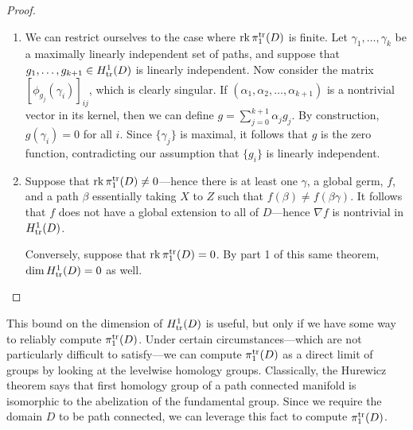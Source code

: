 \begin{proof}
  \phantom{hello!}
\begin{enumerate}
    \item We can restrict ourselves to the case where \(\operatorname{rk} \pi_1^{\operatorname{tr}}(D)\) is
        finite. Let \(\gamma_1, \dots ,\gamma_k\) be a maximally linearly
        independent set of paths, and suppose that
        \(g_1, \dots , g_{k+1} \in H^1_{\operatorname{tr}}(D)\) is linearly independent. Now
        consider the matrix \([\phi_{g_j}(\gamma_i)]_{ij}\), which is clearly
        singular. If \((\alpha_1, \alpha_2, \dots, \alpha_{k+1})\) is a
        nontrivial vector in its
        kernel, then we can define \(g = \sum_{j=0}^{k+1} \alpha_j g_j\). By
        construction, \(g(\gamma_i)=0\) for all \(i\). Since \(\{\gamma_j\} \)
        is maximal, it follows that \(g\) is the zero function, contradicting
        our assumption that \(\{g_i\} \) is linearly independent.

    \item Suppose that \(\operatorname{rk} \pi_1^{\operatorname{tr}}(D) \neq 0\)---hence there is at least
        one \(\gamma\), a global germ, \(f\), and a path \(\beta\) essentially
        taking \(X\) to \(Z\) such that \(f(\beta) \neq f(\beta\gamma)\). It
        follows that \(f\) does not have a global extension to all of
        \(D\)---hence \(\nabla f\) is nontrivial in \(H^1_{\operatorname{tr}}(D)\).

        Conversely, suppose that \(\operatorname{rk} \pi_1^{\operatorname{tr}}(D)=0\). By part 1 of this
        same theorem,
        \(\dim H^1_{\operatorname{tr}}(D)=0\) as well.
\end{enumerate}
\end{proof}

This bound on the dimension of \(H^1_{\operatorname{tr}}(D)\) is useful, but only if we have some
way to reliably compute \(\pi_1^{\operatorname{tr}}(D)\). Under certain circumstances---which
are not particularly difficult to satisfy---we can compute \(\pi_1^{\operatorname{tr}}(D)\) as
a direct limit of groups by looking at the levelwise homology groups. Classically, the
Hurewicz theorem says that
first homology group of a path connected manifold is isomorphic to the
abelization of the fundamental group. Since we require the domain \(D\) to be
path connected, we can leverage this fact to compute \(\pi_1^{\operatorname{tr}}(D)\).

